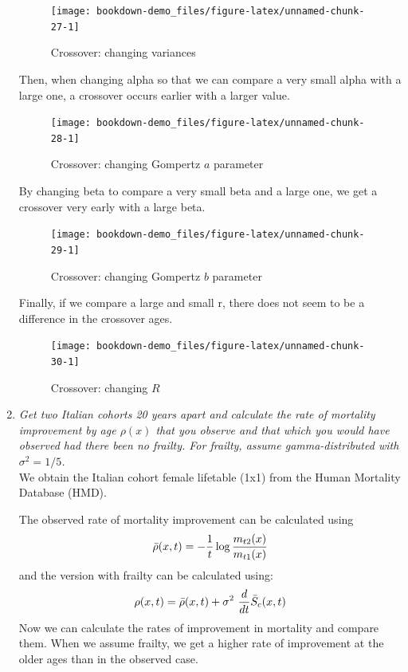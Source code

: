 \documentclass[]{book}
\begin{document}
\begin{enumerate}
  \begin{figure}
   \texttt{[image: bookdown-demo\_files/figure-latex/unnamed-chunk-27-1]} \caption{Crossover: changing variances}\label{fig:unnamed-chunk-27}
   \end{figure}

  Then, when changing alpha so that we can compare a very small alpha with a large one, a crossover occurs earlier with a larger value.

  \begin{figure}
   \texttt{[image: bookdown-demo\_files/figure-latex/unnamed-chunk-28-1]} \caption{Crossover: changing Gompertz $a$ parameter}\label{fig:unnamed-chunk-28}
   \end{figure}

  By changing beta to compare a very small beta and a large one, we get a crossover very early with a large beta.\\

  \begin{figure}
   \texttt{[image: bookdown-demo\_files/figure-latex/unnamed-chunk-29-1]} \caption{Crossover: changing Gompertz $b$ parameter}\label{fig:unnamed-chunk-29}
   \end{figure}

  Finally, if we compare a large and small r, there does not seem to be a difference in the crossover ages.\\

  \begin{figure}
   \texttt{[image: bookdown-demo\_files/figure-latex/unnamed-chunk-30-1]} \caption{Crossover: changing $R$}\label{fig:unnamed-chunk-30}
   \end{figure}
\item
  \emph{Get two Italian cohorts 20 years apart and calculate the rate of mortality improvement by age \(\rho(x)\) that you observe and that which you would have observed had there been no frailty. For frailty, assume gamma-distributed with \(\sigma^2 = 1/5\).}\\
  We obtain the Italian cohort female lifetable (1x1) from the Human Mortality Database (HMD).

  The observed rate of mortality improvement can be calculated using \[ \bar{\rho}(x,t) = - {1 \over t} \log {m_{t2}(x) \over m_{t1}(x) }\] and the version with frailty can be calculated using: \[ \rho(x,t) = \bar{\rho}(x,t) + \sigma^2\ {d \over dt}\bar{S}_c (x,t) \] Now we can calculate the rates of improvement in mortality and compare them. When we assume frailty, we get a higher rate of improvement at the older ages than in the observed case.\\


\end{enumerate}
\end{document}
